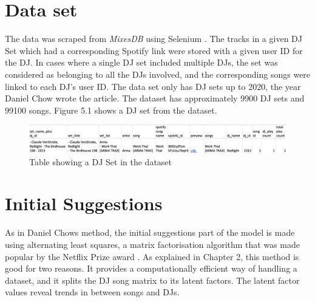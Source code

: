\section{Data set}
The data was scraped from \textit{MixesDB} using Selenium \citep{chow_music_2020}. The tracks in a given DJ Set which had a corresponding Spotify link were stored with a given user ID for the DJ.  In cases where a single DJ set included multiple DJs, the set was considered as belonging to all the DJs involved, and the corresponding songs were linked to each DJ's user ID. The data set only has DJ sets up to 2020, the year Daniel Chow wrote the article. The dataset has approximately 9900 DJ sets and 99100 songs. Figure 5.1 shows a DJ set from the dataset.
\begin{figure}[H]
	\includegraphics[scale=0.4]{images/dataset}
	\centering
	\caption{Table showing a DJ Set in the dataset} 
\end{figure}


\section{Initial Suggestions}
As in Daniel Chows method, the initial suggestions part of the model is made using alternating least squares, a matrix factorisation algorithm that was made popular by the Netflix Prize award \citep{zhou_large-scale_2008}. As explained in Chapter 2, this method is good for two reasons. It provides a computationally efficient way of handling a dataset, and it splits the DJ song matrix to its latent factors. The latent factor values reveal trends in between songs and DJs.

